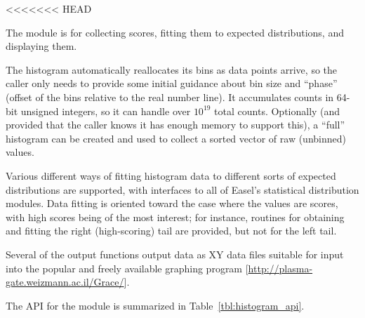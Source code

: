 <<<<<<< HEAD

The  module is for collecting scores, fitting
them to expected distributions, and displaying them.

The histogram automatically reallocates its bins as data points
arrive, so the caller only needs to provide some initial guidance
about bin size and ``phase'' (offset of the bins relative to the real
number line).  It accumulates counts in 64-bit unsigned integers, so
it can handle over $10^19$ total counts.  Optionally (and provided
that the caller knows it has enough memory to support this), a
``full'' histogram can be created and used to collect a sorted vector
of raw (unbinned) values.

Various different ways of fitting histogram data to different sorts of
expected distributions are supported, with interfaces to all of
Easel's statistical distribution modules. Data fitting is oriented
toward the case where the values are scores, with high scores being of
the most interest; for instance, routines for obtaining and fitting
the right (high-scoring) tail are provided, but not for the left tail.

Several of the output functions output data as XY data files suitable
for input into the popular and freely available 
graphing program [\url{http://plasma-gate.weizmann.ac.il/Grace/}].

The API for the  module is summarized in
Table~\ref{tbl:histogram_api}.

